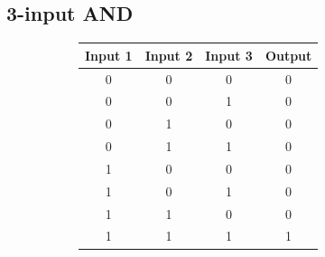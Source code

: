\subsection{3-input AND}

\begin{figure}[H]
  \begin{subfigure}[t]{.49\columnwidth}
    \begin{adjustbox}{width=\textwidth}
    \begin{tabular}[b]{cccc}
      \hline
    \multicolumn{1}{l}{\textbf{Input 1}} & \multicolumn{1}{l}{\textbf{Input 2}} & \multicolumn{1}{l}{\textbf{Input 3}} & \multicolumn{1}{l}{\textbf{Output}} \\
    \hline
    0 & 0                                    & 0                                    & 0                                   \\
    0 & 0                                    & 1                                    & 0                                   \\
    0 & 1                                    & 0                                    & 0                                   \\
    0 & 1                                    & 1                                    & 0                                   \\
    1 & 0                                    & 0                                    & 0                                   \\
    1 & 0                                    & 1                                    & 0                                   \\
    1 & 1                                    & 0                                    & 0                                   \\
    1 & 1                                    & 1                                    & 1                                   \\


\end{tabular}
\end{adjustbox}
\end{subfigure}
\end{figure}
